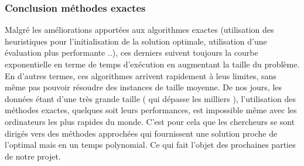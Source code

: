 \documentclass[12pt]{article}
\begin{document}
\subsubsection{Conclusion méthodes exactes}
Malgré les améliorations apportées aux algorithmes exactes (utilisation des heuristiques pour l’initialisation de la solution optimale, utilisation d’une évaluation plus performante ..), ces derniers suivent toujours la courbe exponentielle en terme de temps d'exécution en augmentant la taille du problème. En d’autres termes, ces algorithmes arrivent rapidement à leus limites, sans même pas pouvoir résoudre des instances de taille moyenne.
De nos jours, les données étant d’une très grande taille ( qui dépasse les milliers ), l’utilisation des méthodes exactes, quelques soit leurs performances, est impossible même avec les ordinateurs les plus rapides du monde. C’est pour cela que les chercheurs se sont dirigés vers des méthodes approchées qui fournissent une solution proche de l’optimal mais en un temps polynomial. Ce qui fait l’objet des prochaines parties de notre projet.
\end{document}
